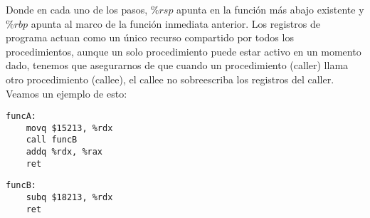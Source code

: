 %
%
%
%
Donde en cada uno de los pasos, $\%rsp$ apunta en la función más abajo existente y $\%rbp$ apunta al marco de la función inmediata anterior.
Los registros de programa actuan como un único recurso compartido por todos los procedimientos, aunque un solo procedimiento puede estar activo en un momento dado,
tenemos que asegurarnos de que cuando un procedimiento (caller) llama otro procedimiento (callee), el callee no sobreescriba los registros del caller. Veamos un ejemplo de esto:
\begin{center}
	\begin{minipage}{0.45\textwidth}
		\begin{verbatim}
funcA:
    movq $15213, %rdx
    call funcB
    addq %rdx, %rax 
    ret
\end{verbatim}
	\end{minipage}
	\begin{minipage}{0.45\textwidth}
		\begin{verbatim}
funcB: 
    subq $18213, %rdx
    ret 
    \end{verbatim}

	\end{minipage}
\end{center}
